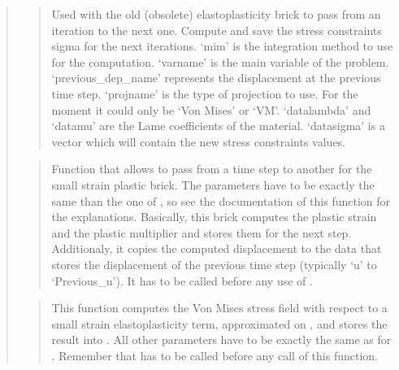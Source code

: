 \documentclass[a4paper,11pt,english]{sphinxmanual}
\begin{document}
\begin{quote}
\begin{quote}
\sphinxAtStartPar
Used with the old (obsolete) elastoplasticity brick to pass from an
iteration to the next one.
Compute and save the stress constraints sigma for the next iterations.
‘mim’ is the integration method to use for the computation.
‘varname’ is the main variable of the problem.
‘previous\_dep\_name’ represents the displacement at the previous time step.
‘projname’ is the type of projection to use. For the moment it could only be ‘Von Mises’ or ‘VM’.
‘datalambda’ and ‘datamu’ are the Lame coefficients of the material.
‘datasigma’ is a vector which will contain the new stress constraints values.
\end{quote}

\sphinxAtStartPar
{}
\begin{quote}

\sphinxAtStartPar
Function that allows to pass from a time step to another for the
small strain plastic brick. The parameters have to be exactly the
same than the one of ,
so see the documentation of this function for the explanations.
Basically, this brick computes the plastic strain
and the plastic multiplier and stores them for the next step.
Additionaly, it copies the computed displacement to the data
that stores the displacement of the previous time step (typically
‘u’ to ‘Previous\_u’). It has to be called before any use of
.
\end{quote}

\sphinxAtStartPar
{}
\begin{quote}

\sphinxAtStartPar
This function computes the Von Mises stress field with respect to
a small strain elastoplasticity term, approximated on ,
and stores the result into .  All other parameters have to be
exactly the same as for .
Remember that  has to be called
before any call of this function.
\end{quote}


\end{quote}
\end{document}
